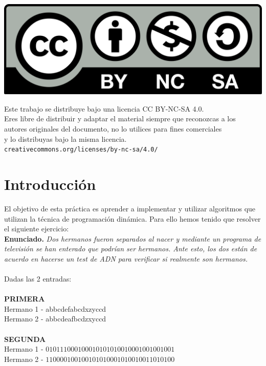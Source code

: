 \documentclass[10pt,a4paper]{article}
\begin{document}
\parbox[t]{\textwidth}{
  \includegraphics[scale=0.05]{by-nc-sa.png}\\[4pt]
  \raggedright %
  \sffamily\large
  {\Large Este trabajo se distribuye bajo una licencia CC BY-NC-SA 4.0.}\\[4pt]
  Eres libre de distribuir y adaptar el material siempre que reconozcas a los\\
  autores originales del documento, no lo utilices para fines comerciales\\
  y lo distribuyas bajo la misma licencia.\\[4pt]
  \texttt{creativecommons.org/licenses/by-nc-sa/4.0/}
}

\newpage

\tableofcontents

\newpage

\section{Introducción}

El objetivo de esta práctica es aprender a implementar y utilizar algoritmos que utilizan la técnica de programación dinámica. Para ello hemos tenido que resolver el siguiente ejercicio:\\

\textbf{Enunciado.} \textit{Dos hermanos fueron separados al nacer y mediante un programa de televisión se han enterado que podrían ser hermanos. Ante esto, los dos están de acuerdo en hacerse un test de ADN para verificar si realmente son hermanos.}\\
\\
Dadas las 2 entradas:\\
\\
\textbf{PRIMERA} \\
Hermano 1 - abbcdefabcdxzyccd \\
Hermano 2 - abbcdeafbcdzxyccd \\
\\
\textbf{SEGUNDA}\\
Hermano 1 - $010111000100010101010010001001001001$\\
Hermano 2 - $110000100100101010001010010011010100$\\
\end{document}
